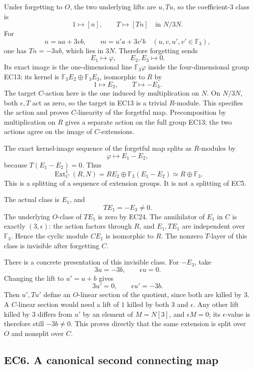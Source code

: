 \documentclass[
  10pt,
  a4paper,
]{article}
\begin{document}
Under forgetting to \(O\), the two underlying lifts are \(u,Tu\), so the
coefficient-3 class is \[
1\longmapsto[n],\qquad T\longmapsto[Tn]
\quad\text{in }N/3N.
\tag{EC23}
\] For \[
n=u a+3v b,\qquad m=u'a+3v'b
\quad(u,v,u',v'\in\mathbb F_3),
\] one has \(Tn=-3u b\), which lies in \(3N\). Therefore forgetting
sends \[
E_1\mapsto\varphi,\qquad E_2,E_3\mapsto0.
\tag{EC24}
\] Its exact image is the one-dimensional line \(\mathbb F_3\varphi\)
inside the four-dimensional group EC13; its kernel is
\(\mathbb F_3E_2\oplus\mathbb F_3E_3\), isomorphic to \(R\) by \[
1\mapsto E_2,\qquad T\mapsto-E_3.
\] The target \(C\)-action here is the one induced by multiplication on
\(N\). On \(N/3N\), both \(\epsilon,T\) act as zero, so the target in
EC13 is a trivial \(R\)-module. This specifies the action and proves
\(C\)-linearity of the forgetful map. Precomposition by multiplication
on \(R\) gives a separate action on the full group EC13; the two actions
agree on the image of \(C\)-extensions.

The exact kernel-image sequence of the forgetful map splits as
\(R\)-modules by \[
\varphi\longmapsto E_1-E_2,
\] because \(T(E_1-E_2)=0\). Thus \[
\operatorname{Ext}^1_C(R,N)
=R E_2\oplus\mathbb F_3(E_1-E_2)
\simeq R\oplus\mathbb F_3.
\tag{EC25}
\] This is a splitting of a sequence of extension groups. It is not a
splitting of EC5.

The actual class is \(E_1\), and \[
TE_1=-E_3\ne0.
\tag{EC26}
\] The underlying \(O\)-class of \(TE_1\) is zero by EC24. The
annihilator of \(E_1\) in \(C\) is exactly \((3,\epsilon)\): the action
factors through \(R\), and \(E_1,TE_1\) are independent over
\(\mathbb F_3\). Hence the cyclic module \(CE_1\) is isomorphic to
\(R\). The nonzero \(T\)-layer of this class is invisible after
forgetting \(C\).

There is a concrete presentation of this invisible class. For \(-E_3\),
take \[
3u=-3b,\qquad\epsilon u=0.
\] Changing the lift to \(u'=u+b\) gives \[
3u'=0,\qquad \epsilon u'=-3b.
\tag{EC27}
\] Then \(u',Tu'\) define an \(O\)-linear section of the quotient, since
both are killed by 3. A \(C\)-linear section would need a lift of \(1\)
killed by both 3 and \(\epsilon\). Any other lift killed by 3 differs
from \(u'\) by an element of \(M=N[3]\), and \(\epsilon M=0\); its
\(\epsilon\)-value is therefore still \(-3b\ne0\). This proves directly
that the same extension is split over \(O\) and nonsplit over \(C\).

\subsection{EC6. A canonical second connecting
map}\label{ec6.-a-canonical-second-connecting-map}
\end{document}
